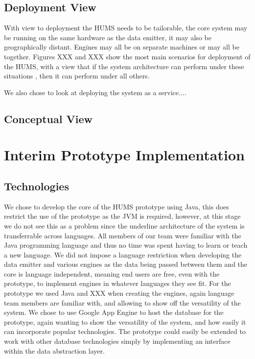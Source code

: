 \documentclass[10pt,a4paper]{article}
\begin{document}

\subsection{Deployment View}
With view to deployment the HUMS needs to be tailorable, the core system may be running on the same hardware as the data emitter, it may also be geographically distant. Engines may all be on separate machines or may all be together. Figures XXX and XXX show the most main scenarios for deployment of the HUMS, with a view that if the system architecture can perform under these situations , then it can perform under all others.

We also chose to look at deploying the system as a service....

\subsection{Conceptual View}

\section{Interim Prototype Implementation}

\subsection{Technologies}
We chose to develop the core of the HUMS prototype using Java, this does restrict the use of the prototype as the JVM is required, however, at this stage we do not see this as a problem since the underline architecture of the system is transferrable across languages.
All members of our team were familiar with the Java programming language and thus no time was spent having to learn or teach a new language. 
We did not impose a language restriction when developing the data emitter and various engines as the data being passed between them and the core is language independent, meaning end users are free, even with the prototype, to implement engines in whatever languages they see fit. For the prototype we used Java and XXX when creating the engines, again language team members are familiar with, and allowing to show off the versatility of the system.
We chose to use Google App Engine to host the database for the prototype, again wanting to show the versatility of the system, and how easily it can incorporate popular technologies. The prototype could easily be extended to work with other database technologies simply by implementing an interface within the data abstraction layer.
\end{document}
